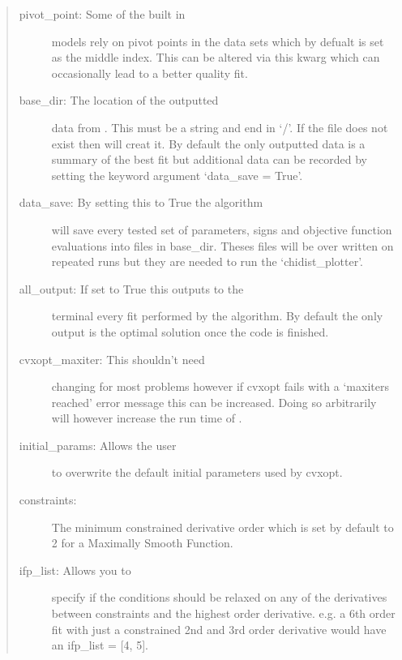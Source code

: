 \documentclass[letterpaper,10pt,english]{sphinxmanual}
\begin{document}
\begin{fulllineitems}
\begin{quote}
\begin{description}
\item[{pivot\_point:  Some of the built in}] \leavevmode
models rely on pivot points in the data sets which by defualt is
set as the middle index. This can be altered via this kwarg which
can occasionally lead to a better quality fit.

\item[{base\_dir:  The location of the outputted}] \leavevmode
data from . This must be a string and end in ‘/’. If the
file does not exist then  will creat it. By default the
only outputted data is a summary of the best fit but additional data
can be recorded by setting the keyword argument ‘data\_save = True’.

\item[{data\_save:  By setting this to True the algorithm}] \leavevmode
will save every tested set of parameters, signs and objective
function evaluations into files in base\_dir. Theses files will be
over written on repeated runs but they are needed to run the
‘chidist\_plotter’.

\item[{all\_output:  If set to True this outputs to the}] \leavevmode
terminal every fit performed by the algorithm. By default the only
output is the optimal solution once the code is finished.

\item[{cvxopt\_maxiter:  This shouldn’t need}] \leavevmode
changing for most problems however if cvxopt fails with a ‘maxiters
reached’ error message this can be increased. Doing so arbitrarily
will however increase the run time of .

\item[{initial\_params:  Allows the user}] \leavevmode
to overwrite the default initial parameters used by cvxopt.

\item[{constraints: }] \leavevmode
The minimum constrained derivative order which is set by default to
2 for a Maximally Smooth Function.

\item[{ifp\_list:  Allows you to}] \leavevmode
specify if the conditions should be relaxed on any
of the derivatives between constraints and the highest order
derivative. e.g. a 6th order fit with just a constrained 2nd and 3rd
order derivative would have an ifp\_list = {[}4, 5{]}.


\end{description}
\end{quote}
\end{fulllineitems}
\end{document}
